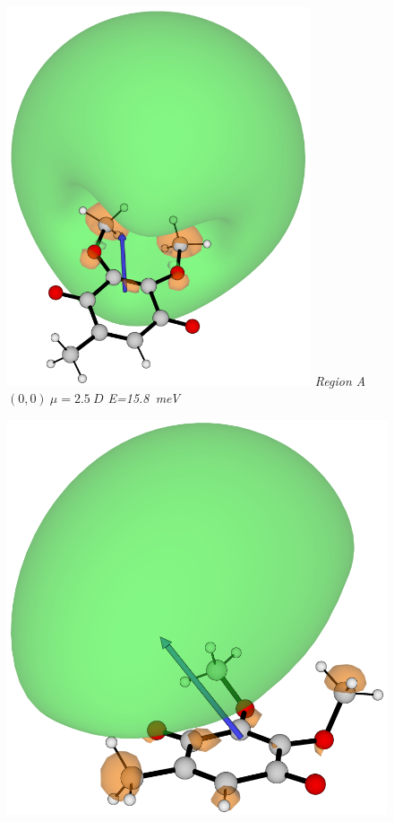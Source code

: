 \begin{figure}[h]
\begin{minipage}[b]{0.30\textwidth}
      \includegraphics[width=0.8\textwidth]{chapters/results/image/Q0_181.png}
      \small\emph{Region A \\ $(0,0)~\mu=2.5~D$ E=15.8~meV}
  \end{minipage}
  \hfill
  \begin{minipage}[b]{0.30\textwidth}
    \centering
      \includegraphics[width=\textwidth]{chapters/results/image/Q0_52.png}

\end{minipage}
\end{figure}
